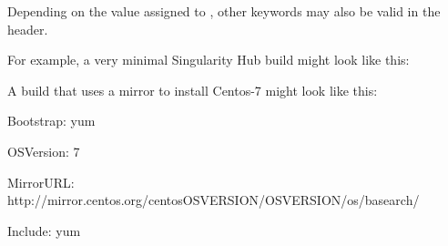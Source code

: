 \documentclass[letterpaper,10pt,english]{sphinxmanual}
\begin{document}
\begin{DUlineblock}{0em}
\item[] Depending on the value assigned to , other keywords may also be valid
in the header.
\item[] For example, a very minimal Singularity Hub build might look like
this:
\end{DUlineblock}

%
\begin{sphinxVerbatim}[commandchars=\\\{\}]
 

 
\end{sphinxVerbatim}

A build that uses a mirror to install Centos-7 might look like this:

%
\begin{sphinxVerbatim}[commandchars=\\\{\}]
Bootstrap: yum

OSVersion: 7

MirrorURL: http://mirror.centos.org/centos\PYGZhy{}\PYGZpc{}\PYGZob{}OSVERSION\PYGZcb{}/\PYGZpc{}\PYGZob{}OSVERSION\PYGZcb{}/os/\PYGZdl{}basearch/

Include: yum
\end{sphinxVerbatim}
\end{document}
